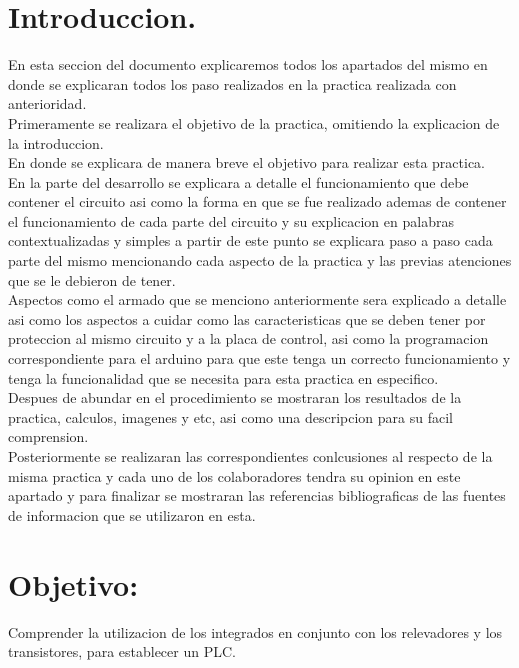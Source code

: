 \documentclass[12pt,a4paper]{article}
\begin{document}
\section{Introduccion.}
En esta seccion del documento explicaremos todos los apartados del mismo en donde se explicaran todos los paso realizados en la practica realizada con anterioridad.\\
 Primeramente se realizara el objetivo de la practica, omitiendo la explicacion de la introduccion.\\
 En donde se explicara de manera breve el objetivo para realizar esta practica.\\
 En la parte del desarrollo se explicara a detalle el funcionamiento que debe contener el circuito asi como la forma en que se fue realizado ademas de contener el funcionamiento de cada parte del circuito y su explicacion en palabras contextualizadas y simples a partir de este punto se explicara paso a paso cada parte del mismo mencionando cada aspecto de la practica y las previas atenciones que se le debieron de tener.\\
 Aspectos como el armado que se menciono anteriormente sera explicado a detalle asi como los aspectos a cuidar como las caracteristicas que se deben tener por proteccion al mismo circuito y a la placa de control, asi como la programacion correspondiente para el arduino para que  este tenga un correcto funcionamiento y tenga la funcionalidad que se necesita para esta practica en especifico.\\
 Despues de abundar en el procedimiento se mostraran los resultados de la practica, calculos, imagenes y etc, asi como una descripcion para su facil comprension.\\
 Posteriormente se realizaran las correspondientes conlcusiones al respecto de la misma practica y cada uno de los colaboradores  tendra su opinion en este apartado y para finalizar se mostraran las referencias bibliograficas de las fuentes de informacion que se utilizaron en esta.  

 \section{Objetivo:}
Comprender la utilizacion de los integrados en conjunto con los relevadores y los transistores, para establecer un PLC.
\end{document}
